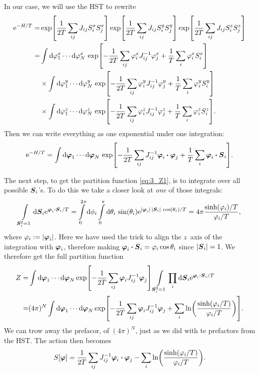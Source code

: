 \documentclass[11pt,letter, swedish, english
]{article}
\begin{document}
In our case, we will use the HST to rewrite
\begin{equation}
\begin{aligned}
\ee^{-H/T}=&\exp[\frac{1}{2T}\sum_{ij}J_{ij}S_i^xS_j^x]
\exp[\frac{1}{2T}\sum_{ij}J_{ij}S_i^yS_j^y]
\exp[\frac{1}{2T}\sum_{ij}J_{ij}S_i^zS_j^z]\\
=&\int\rd\varphi_1^x\cdots\rd\varphi_N^x
\,\exp[-\frac{1}{2T}\sum_{ij}\varphi_i^xJ_{ij}^{-1}\varphi_j^x
+\frac{1}{T}\sum_i\varphi_i^xS_i^x]\\
&\times\int\rd\varphi_1^y\cdots\rd\varphi_N^y
\,\exp[-\frac{1}{2T}\sum_{ij}\varphi_i^yJ_{ij}^{-1}\varphi_j^y
+\frac{1}{T}\sum_i\varphi_i^yS_i^y]\\
&\times\int\rd\varphi_1^z\cdots\rd\varphi_N^z
\,\exp[-\frac{1}{2T}\sum_{ij}\varphi_i^zJ_{ij}^{-1}\varphi_j^z
+\frac{1}{T}\sum_i\varphi_i^zS_i^z].
\end{aligned}
\end{equation}
Then we can write everything as one exponential under one integration:
\begin{equation}
\ee^{-H/T}=\int\rd\vb*\varphi_1\cdots\rd\vb*\varphi_N
\,\exp[-\frac{1}{2T}\sum_{ij}J_{ij}^{-1}\vb*\varphi_i\vdot\vb*\varphi_j
+\frac{1}{T}\sum_i\vb*\varphi_i\vdot\vb*S_i].
\end{equation}

The next step, to get the partition function \eqref{eq:3_Z1}, is to integrate over all
possible $\vb*S_i$'s. To do this we take a closer look at \emph{one}
of those integrals: 
\begin{equation}
\int_{\vb*S_i^2=1}\rd\vb*S_i\ee^{\vb*\varphi_i\vdot\vb*S_i/T}
=\int_0^{2\pi}\rd\phi_i\int_0^{\pi}\rd\theta_i\,\sin(\theta_i)
\ee^{|\vb*\varphi_i|\,|\vb*S_i|\,\cos(\theta_i)/T}
=4\pi\frac{\sinh(\varphi_i)/T}{\varphi_i/T},
\end{equation}
where $\varphi_i:=|\vb*\varphi_i|$.
Here we have used the trick to align the $z$~axis of the integration
with $\vb*\varphi_i$, therefore making
$\vb*\varphi_i\vdot\vb*S_i=\varphi_i\cos\theta_i$ since $|\vb*S_i|=1$.
We therefore get the full partition function
\begin{equation}
\begin{aligned}
Z=&\int\rd\vb*\varphi_1\cdots\rd\vb*\varphi_N
\exp[-\frac{1}{2T}\sum_{ij}\vb*\varphi_iJ_{ij}^{-1}\vb*\varphi_j]
\int_{\vb*S_i^2=1}\prod_i\rd\vb*S_i\ee^{\vb*\varphi_i\vdot\vb*S_i/T}\\
=&(4\pi)^N\int\rd\vb*\varphi_1\cdots\rd\vb*\varphi_N
\exp[-\frac{1}{2T}\sum_{ij}\vb*\varphi_iJ_{ij}^{-1}\vb*\varphi_j
+\sum_i\ln(\frac{\sinh(\varphi_i/T)}{\varphi_i/T})].
\end{aligned}
\end{equation}
We can trow away the prefacor, of $(4\pi)^N$, just as we did with te
prefactors from the HST. The action then becomes
\begin{equation}
S[\vb*\varphi]=\frac{1}{2T}\sum_{ij}J_{ij}^{-1}\vb*\varphi_i\vdot\vb*\varphi_j
-\sum_i\ln(\frac{\sinh(\varphi_i/T)}{\varphi_i/T}).
\end{equation}
\end{document}
